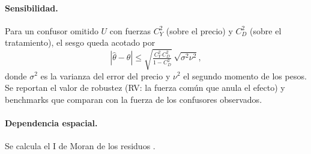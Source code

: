 \paragraph{Sensibilidad.} Para un confusor omitido $U$ con fuerzas $C_Y^2$ (sobre el precio) y $C_D^2$ (sobre el tratamiento), el sesgo queda acotado por \citep{chernozhukov2022}
\begin{equation}\label{eq:cota}
|\hat\theta-\theta|\le\sqrt{\tfrac{C_Y^2\,C_D^2}{1-C_D^2}}\,\sqrt{\sigma^2\nu^2},
\end{equation}
donde $\sigma^2$ es la varianza del error del precio y $\nu^2$ el segundo momento de los pesos. Se reportan el valor de robustez (RV: la fuerza común que anula el efecto) y benchmarks que comparan con la fuerza de los confusores observados.

\paragraph{Dependencia espacial.} Se calcula el I de Moran de los residuos \citep{moran1950}.
